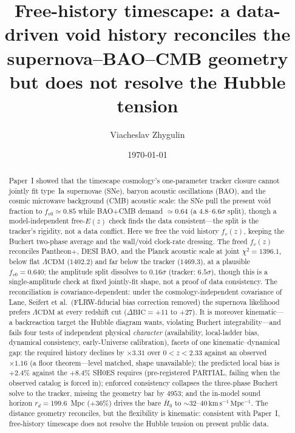 \documentclass[aps,prd,twocolumn,nofootinbib,superscriptaddress,floatfix]{revtex4-2}
\newcommand{\Hbaro}{\bar H_{0}}
\newcommand{\fvo}{f_{v0}}
\newcommand{\fvz}{f_{v}(z)}
\newcommand{\kmsmpc}{\,\mathrm{km\,s^{-1}\,Mpc^{-1}}}
\newcommand{\Lcdm}{\Lambda\mathrm{CDM}}
\newcommand{\dBIC}{\Delta\mathrm{BIC}}
\newcommand{\rd}{r_{d}}
\begin{document}
\title{Free-history timescape: a data-driven void history reconciles the
supernova--BAO--CMB geometry but does not resolve the Hubble tension}

\author{Viacheslav Zhygulin}
\date{\today}

\begin{abstract}
Paper~I showed that the timescape cosmology's one-parameter tracker closure cannot
jointly fit type~Ia supernovae (SNe), baryon acoustic oscillations (BAO), and the
cosmic microwave background (CMB) acoustic scale: the SNe pull the present void
fraction to $\fvo\simeq0.85$ while BAO$+$CMB demand $\simeq0.64$ (a
$4.8$--$6.6\sigma$ split), though a model-independent free-$E(z)$ check finds the
data consistent---the split is the tracker's rigidity, not a data conflict. Here we
free the void history $\fvz$, keeping the Buchert two-phase average and the
wall/void clock-rate dressing. The freed $\fvz$ reconciles Pantheon$+$, DESI BAO,
and the Planck acoustic scale at joint $\chi^2=1396.1$, below flat $\Lcdm$
($1402.2$) and far below the tracker ($1469.3$), at a plausible $\fvo=0.640$; the
amplitude split dissolves to $0.16\sigma$ (tracker: $6.5\sigma$), though this is a
single-amplitude check at fixed jointly-fit shape, not a proof of data consistency.
The reconciliation is covariance-dependent: under the cosmology-independent
covariance of Lane, Seifert et al.\ (FLRW-fiducial bias correction removed) the
supernova likelihood prefers $\Lcdm$ at every redshift cut ($\dBIC=+11$ to $+27$).
It is moreover kinematic---a backreaction target the Hubble diagram wants, violating
Buchert integrability---and fails four tests of independent physical \emph{character}
(availability, local-ladder bias, dynamical consistency, early-Universe
calibration), facets of one kinematic--dynamical gap: the required history declines
by $\times3.31$ over $0<z<2.33$ against an observed $\times1.16$ (a floor
theorem---level matched, shape unavailable); the predicted local bias is $+2.4\%$
against the $+8.4\%$ SH0ES requires (pre-registered PARTIAL, failing when the
observed catalog is forced in); enforced consistency collapses the three-phase
Buchert solve to the tracker, missing the geometry bar by $4953$; and the in-model
sound horizon $\rd=199.6$~Mpc ($+36\%$) drives the bare $\Hbaro$ to
$\sim\!32$--$40\kmsmpc$. The distance geometry reconciles, but the flexibility is
kinematic: consistent with Paper~I, free-history timescape does not resolve the
Hubble tension on present public data.
\end{abstract}
\end{document}
